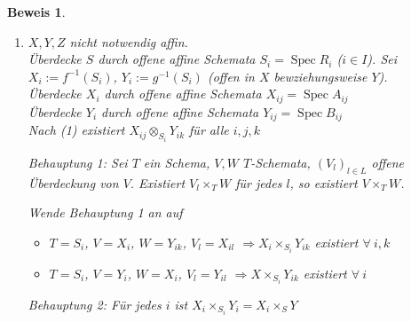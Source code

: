 \documentclass[paper = A4, fontsize=12pt, numbers=noendperiod, chapterprefix=true]{scrbook}
\theoremstyle{break}
\theoremstyle{nonumberbreak}
\newtheorem{bew}{Beweis}
\theoremstyle{nonumberplain}
\newcommand{\quot}[1]{\textrm{\glqq}{#1}\textrm{\grqq}}
\DeclareMathOperator{\Spec}{Spec}
\newcommand{\calO}{\mathcal{O}}
\newcommand{\X}{\times}
\begin{document}
\begin{bew}
\begin{enumerate}[(1)]
\begin{enumerate}[\textbullet]
\begin{center}
\end{center}
		\quot{Beweis:} $\tilde \gamma: A \X B \to C$, $(a,b) \mapsto \alpha(a) \cdot \beta(b)$ ist bilinear, induziert also $\gamma: A \otimes B \to C$ linear. Nachrechnen: $\gamma$ Ringhomomorphismus, $\gamma$ eindeutig.
	\end{enumerate}
	\emph{Also:} $\Spec(A \otimes_R B)$ erf\"ullt die geforderte UAE f\"ur alle affinen Schemata $Z$.
	
	Ist $Z$ beliebiges Schema, so induzieren $\varphi: Z \to X$ und $\psi: Z \to Y$ $R$-Algebrahomomorphismen $\alpha: A \to \calO_Z(Z)$, $\beta: B \to \calO_Z(Z)$.\\
	$\alpha$ und $\beta$ induzieren $\gamma: A\otimes_R B \to \calO_Z(Z)$, also (\"Ubung 3, Aufgabe 1) Morphismus $h: Z \to \Spec (A \otimes_R B)$.
\item
	$X,Y,Z$ nicht notwendig affin.\\
	\"Uberdecke $S$ durch offene affine Schemata $S_i = \Spec R_i$ ($i\in I$). Sei $X_i:= f^{-1}(S_i)$, $Y_i:= g^{-1}(S_i)$ (offen in $X$ bewziehungsweise $Y$).\\
	\"Uberdecke $X_i$ durch offene affine Schemata $X_{ij} = \Spec A_{ij}$\\
	\"Uberdecke $Y_i$ durch offene affine Schemata $Y_{ij} = \Spec B_{ij}$\\
	Nach (1) existiert $X_{ij} \otimes_{S_i} Y_{ik}$ f\"ur alle $i,j,k$
	
	\emph{Behauptung 1:} Sei $T$ ein Schema, $V,W$ $T$-Schemata, $(V_l)_{l\in L}$ offene \"Uberdeckung von $V$. Existiert $V_l \X_T W$ f\"ur jedes $l$, so existiert $V \X_T W$.
	
	Wende Behauptung 1 an auf\begin{itemize}
	\item
		$T=S_i$, $V = X_i$, $W=Y_{ik}$, $V_l=X_{il}$ $\Rightarrow X_i \X_{S_i} Y_{ik}$ existiert $\forall\  i,k$
	\item
		$T=S_i$, $V = Y_i$, $W=X_{i}$, $V_l=Y_{il}$ $\Rightarrow X \X_{S_i} Y_{ik}$ existiert $\forall\  i$
	\end{itemize}

	\emph{Behauptung 2:} F\"ur jedes $i$ ist $X_i \X_{S_i} Y_i = X_i \X_{S} Y$
	

\end{enumerate}
\end{bew}
\end{document}

